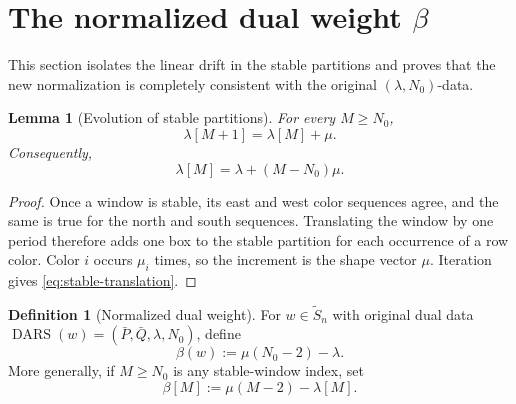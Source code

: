 \documentclass[11pt]{article}
\newtheorem{lemma}[theorem]{Lemma}
\theoremstyle{definition}
\newtheorem{definition}[theorem]{Definition}
\theoremstyle{remark}
\newcommand{\Sn}{\widetilde S_n}
\newcommand{\RSd}{\operatorname{DARS}}
\begin{document}
\section{The normalized dual weight \texorpdfstring{\(\beta\)}{beta}}\label{sec:beta}

This section isolates the linear drift in the stable partitions and proves that the new
normalization is completely consistent with the original \((\lambda,N_0)\)-data.

\begin{lemma}[Evolution of stable partitions]\label{lem:stable-evolution}
For every \(M\ge N_0\),
\begin{equation}\label{eq:stable-evolution}
                   \lambda[M+1]=\lambda[M]+\mu.
\end{equation}
Consequently,
\begin{equation}\label{eq:stable-translation}
                   \lambda[M]=\lambda+(M-N_0)\mu.
\end{equation}
\end{lemma}

\begin{proof}
Once a window is stable, its east and west color sequences agree, and the same is true
for the north and south sequences.  Translating the window by one period therefore adds
one box to the stable partition for each occurrence of a row color.  Color \(i\) occurs
\(\mu_i\) times, so the increment is the shape vector \(\mu\).  Iteration gives
\eqref{eq:stable-translation}.
\end{proof}

\begin{definition}[Normalized dual weight]\label{def:beta}
For \(w\in\Sn\) with original dual data
\(\RSd(w)=(\bar P,\bar Q,\lambda,N_0)\), define
\begin{equation}\label{eq:beta-first}
                         \beta(w):=\mu(N_0-2)-\lambda.
\end{equation}
More generally, if \(M\ge N_0\) is any stable-window index, set
\begin{equation}\label{eq:beta-M}
                         \beta[M]:=\mu(M-2)-\lambda[M].
\end{equation}
\end{definition}
\end{document}
